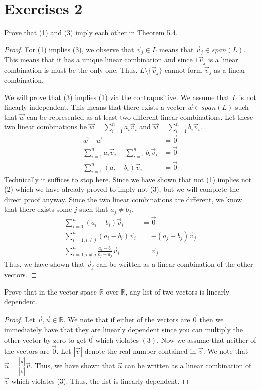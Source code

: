 \section{Exercises 2}
\begin{exercise}
    Prove that (1) and (3) imply each other in Theorem 5.4.
\end{exercise}
\begin{proof}
    For (1) implies (3), we observe that $\vec{v}_j\in L$ means that $\vec{v}_j\in span(L)$. This means that it has a unique linear combination and since $1\vec{v}_j$ is a linear combination is must be the only one. Thus, $L\setminus\{\vec{v}_j\}$ cannot form $\vec{v}_j$ as a linear combination.

    We will prove that (3) implies (1) via the contrapositive. We assume that $L$ is not linearly independent. This means that there exists a vector $\vec{w}\in span(L)$ such that $\vec{w}$ can be represented as at least two different linear combinations. Let these two linear combinations be $\vec{w}=\sum_{i=1}^n a_i\vec{v}_i$ and $\vec{w}=\sum_{i=1}^n b_i\vec{v}_i$.
    \begin{align*}
        \vec{w}-\vec{w}&=\vec{0}\\
        \sum_{i=1}^n a_i\vec{v}_i-\sum_{i=1}^n b_i\vec{v}_i&=\vec{0}\\
        \sum_{i=1}^n (a_i-b_i)\vec{v}_i&=\vec{0}
    \end{align*}
    Technically it suffices to stop here. Since we have shown that not (1) implies not (2) which we have already proved to imply not (3), but we will complete the direct proof anyway. Since the two linear combinations are different, we know that there exists some $j$ such that $a_j\neq b_j$.
    \begin{align*}
        \sum_{i=1}^n (a_i-b_i)\vec{v}_i&=\vec{0}\\
        \sum_{i=1, i\neq j}^n (a_i-b_i)\vec{v}_i&=-(a_j-b_j)\vec{v}_j\\
        \sum_{i=1, i\neq j}^n \frac{a_i-b_i}{b_j-a_j}\vec{v}_i&=\vec{v}_j
    \end{align*}
    Thus, we have shown that $\vec{v}_j$ can be written as a linear combination of the other vectors.
\end{proof}
\begin{exercise}
    Prove that in the vector space $\mathbb{R}$ over $\mathbb{R}$, any list of two vectors is linearly dependent.
\end{exercise}
\begin{proof}
    Let $\vec{v},\vec{u}\in\mathbb{R}$. We note that if either of the vectors are $\vec{0}$ then we immediately have that they are linearly dependent since you can multiply the other vector by zero to get $\vec{0}$ which violates $(3)$. Now we assume that neither of the vectors are $\vec{0}$. Let $|\vec{v}|$ denote the real number contained in $\vec{v}$. We note that $\vec{u}=\frac{|\vec{u}|}{|\vec{v}|}\vec{v}$. Thus, we have shown that $\vec{u}$ can be written as a linear combination of $\vec{v}$ which violates (3). Thus, the list is linearly dependent.
\end{proof}
